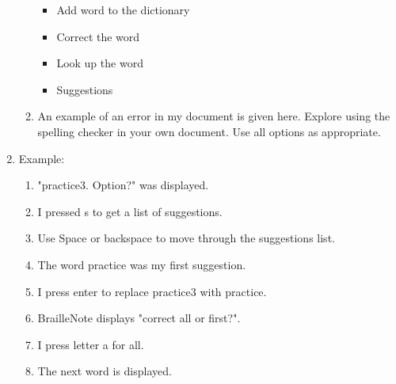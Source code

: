 \documentclass[10pt,letterpaper,twoside]{report}
\begin{document}
\begin{enumerate}
\begin{enumerate}
\begin{itemize}
			            \item Add word to the dictionary 
			            \item Correct the word 
			            \item Look up the word 
			            \item Suggestions 
		            \end{itemize}
		      \item An example of an error in my document is given here. Explore using the spelling checker in your own document. Use all options as appropriate.
	      \end{enumerate}
	\item Example:
	      \begin{enumerate}
		      \item "practice3. Option?" was displayed.
		      \item I pressed s to get a list of suggestions.
		      \item Use Space or backspace to move through the suggestions list.
		      \item The word practice was my first suggestion.
		      \item I press enter to replace practice3 with practice.
		      \item BrailleNote displays "correct all or first?".
		      \item I press letter a for all.
		      \item The next word is displayed.
	      \end{enumerate}
\end{enumerate}
\end{document}
